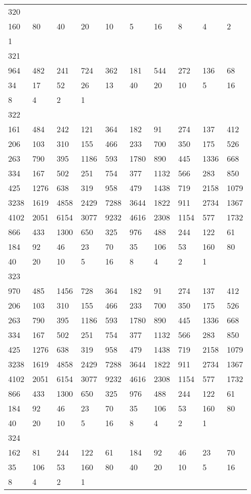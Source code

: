 \begin{longtable}{*{10}{l}}
320&&&&&&&&&\\
160& 80& 40& 20& 10& 5& 16& 8& 4& 2\\
1& \\

321&&&&&&&&&\\
964& 482& 241& 724& 362& 181& 544& 272& 136& 68\\
34& 17& 52& 26& 13& 40& 20& 10& 5& 16\\
8& 4& 2& 1& \\

322&&&&&&&&&\\
161& 484& 242& 121& 364& 182& 91& 274& 137& 412\\
206& 103& 310& 155& 466& 233& 700& 350& 175& 526\\
263& 790& 395& 1186& 593& 1780& 890& 445& 1336& 668\\
334& 167& 502& 251& 754& 377& 1132& 566& 283& 850\\
425& 1276& 638& 319& 958& 479& 1438& 719& 2158& 1079\\
3238& 1619& 4858& 2429& 7288& 3644& 1822& 911& 2734& 1367\\
4102& 2051& 6154& 3077& 9232& 4616& 2308& 1154& 577& 1732\\
866& 433& 1300& 650& 325& 976& 488& 244& 122& 61\\
184& 92& 46& 23& 70& 35& 106& 53& 160& 80\\
40& 20& 10& 5& 16& 8& 4& 2& 1& \\

323&&&&&&&&&\\
970& 485& 1456& 728& 364& 182& 91& 274& 137& 412\\
206& 103& 310& 155& 466& 233& 700& 350& 175& 526\\
263& 790& 395& 1186& 593& 1780& 890& 445& 1336& 668\\
334& 167& 502& 251& 754& 377& 1132& 566& 283& 850\\
425& 1276& 638& 319& 958& 479& 1438& 719& 2158& 1079\\
3238& 1619& 4858& 2429& 7288& 3644& 1822& 911& 2734& 1367\\
4102& 2051& 6154& 3077& 9232& 4616& 2308& 1154& 577& 1732\\
866& 433& 1300& 650& 325& 976& 488& 244& 122& 61\\
184& 92& 46& 23& 70& 35& 106& 53& 160& 80\\
40& 20& 10& 5& 16& 8& 4& 2& 1& \\

324&&&&&&&&&\\
162& 81& 244& 122& 61& 184& 92& 46& 23& 70\\
35& 106& 53& 160& 80& 40& 20& 10& 5& 16\\
8& 4& 2& 1& \\


\end{longtable}
